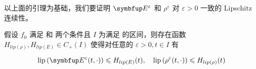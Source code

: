 




以上面的引理为基础，我们要证明 $\vE^\varepsilon$ 和 $\rho^\varepsilon$ 对 $\varepsilon>0$ 一致的 Lipschitz 连续性。
\begin{lemma}
    假设 $f_{0}$ 满足 \supremumf 和 \lipOffVsphere 两个条件且 $I$ 为满足 \boundcondition 的区间，则存在函数 $H_{lip(\rho)}, H_{lip(E)} \in C_{+}(I)$ 使得对任意的 $\varepsilon>0, t \in I$ 有

        \[
        \operatorname{lip}\left(\vE^{\varepsilon}(t, \cdot)\right) \leqslant H_{lip(E)}(t), \quad \operatorname{lip}\left(\rho^{\varepsilon}(t, \cdot)\right) \leqslant H_{lip(\rho)}(t)
        \]
\end{lemma}

